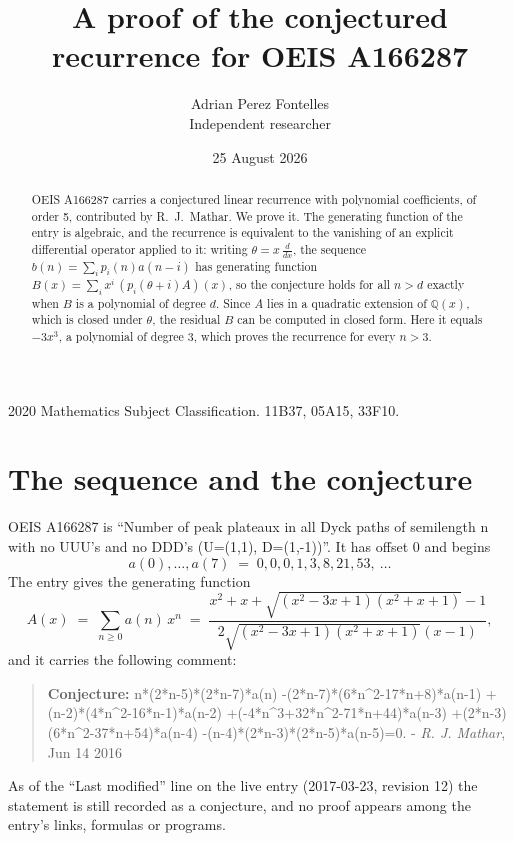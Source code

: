 \documentclass[11pt,a4paper]{article}
\title{A proof of the conjectured recurrence for OEIS A166287}
\author{Adrian Perez Fontelles\\ \small Independent researcher}
\date{25 August 2026}
\theoremstyle{plain}
\theoremstyle{definition}
\begin{document}
\maketitle

\begin{abstract}
OEIS A166287 carries a conjectured linear recurrence with polynomial coefficients, of
order 5, contributed by R.~J.~Mathar. We prove it. The generating function of the
entry is algebraic, and the recurrence is equivalent to the vanishing of an explicit
differential operator applied to it: writing $\theta=x\,\frac{d}{dx}$, the sequence
$b(n)=\sum_{i}p_{i}(n)a(n-i)$ has generating function
$B(x)=\sum_{i}x^{i}\,(p_{i}(\theta+i)A)(x)$, so the conjecture holds for all $n>d$ exactly
when $B$ is a polynomial of degree $d$. Since $A$ lies in a quadratic extension of
$\mathbb{Q}(x)$, which is closed under $\theta$, the residual $B$ can be computed in
closed form. Here it equals $- 3 x^{3}$, a polynomial of degree $3$, which proves
the recurrence for every $n>3$.
\end{abstract}

\noindent\small 2020 Mathematics Subject Classification. 11B37, 05A15, 33F10.\normalsize

\section{The sequence and the conjecture}

OEIS A166287 is ``Number of peak plateaux in all Dyck paths of semilength n with no UUU's and no DDD's (U=(1,1), D=(1,-1))''. It has offset $0$ and begins
\[
a(0),\dots,a(7)\;=\;0, 0, 0, 1, 3, 8, 21, 53,\ \dots
\]
The entry gives the generating function
\begin{equation}\label{eq:gf}
A(x)\;=\;\sum_{n\ge 0} a(n)\,x^{n}\;=\;\frac{x^{2} + x + \sqrt{\left(x^{2} - 3 x + 1\right) \left(x^{2} + x + 1\right)} - 1}{2 \sqrt{\left(x^{2} - 3 x + 1\right) \left(x^{2} + x + 1\right)} \left(x - 1\right)} ,
\end{equation}
and it carries the following comment:
\begin{quote}\small
\textbf{Conjecture:} n*(2*n-5)*(2*n-7)*a(n) -(2*n-7)*(6*n\^{}2-17*n+8)*a(n-1) +(n-2)*(4*n\^{}2-16*n-1)*a(n-2) +(-4*n\^{}3+32*n\^{}2-71*n+44)*a(n-3) +(2*n-3) (6*n\^{}2-37*n+54)*a(n-4) -(n-4)*(2*n-3)*(2*n-5)*a(n-5)=0. - \emph{R. J. Mathar}, Jun 14 2016
\end{quote}
As of the ``Last modified'' line on the live entry (2017-03-23, revision 12) the
statement is still recorded as a conjecture, and no proof appears among the entry's links,
formulas or programs.
\end{document}
